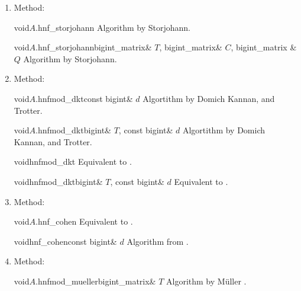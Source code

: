 {\begin{enumerate}
\item Method:

  \begin{fcode}{void}{$A$.hnf_storjohann}{}
    Algorithm by Storjohann.
  \end{fcode}

  \begin{fcode}{void}{$A$.hnf_storjohann}{bigint_matrix& $T$, bigint_matrix& $C$, bigint_matrix & $Q$}
    Algorithm by Storjohann.
  \end{fcode}

\item Method:

  \begin{fcode}{void}{$A$.hnfmod_dkt}{const bigint& $d$}
    Algortithm by Domich Kannan, and Trotter.
  \end{fcode}

  \begin{fcode}{void}{$A$.hnfmod_dkt}{bigint& $T$, const bigint& $d$}
    Algortithm by Domich Kannan, and Trotter.
  \end{fcode}

  \begin{fcode}{void}{hnfmod_dkt}{}
    Equivalent to .
  \end{fcode}

  \begin{fcode}{void}{hnfmod_dkt}{bigint& $T$, const bigint& $d$}
    Equivalent to .
  \end{fcode}

\item Method:

  \begin{fcode}{void}{$A$.hnf_cohen}{}
    Equivalent to .
  \end{fcode}

  \begin{fcode}{void}{hnf_cohen}{const bigint& $d$}
    Algorithm from \cite{Cohen:1995}.
  \end{fcode}

\item Method:

  \begin{fcode}{void}{$A$.hnfmod_mueller}{bigint_matrix& $T$}
    Algorithm by M\"uller \cite{Mueller_Thesis:1994}.
  \end{fcode}

\end{enumerate}

}
